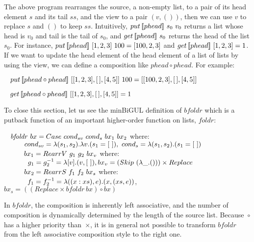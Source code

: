 The above program rearranges the source, a non-empty list, to a pair of its head element $s$ and its tail $ss$, and the view to a pair $(v, ())$, then we can use $v$ to replace $s$ and $()$ to keep $ss$. Intuitively, $put \, [\![phead]\!] \ s_0 \ v_0$ returns a list whose head is $v_0$ and tail is the tail of $s_0$, and $get \, [\![phead]\!] \ s_0$ returns the head of the list $s_0$. For instance, $put \, [\![phead]\!] \ [1,2,3] \ 100 = [100,2,3]$ and $get \, [\![phead]\!] \ [1,2,3] = 1$. If we want to update the head element of the head element of a list of lists by using the view, we can define a composition like $phead \circ phead$. For example:

\smallvspace
$\hspace*{3mm} put \, [\![phead \circ phead]\!] \ [[1,2,3],[\,],[4,5]] \ 100 = [[100,2,3],[\,],[4,5]]$

$\hspace*{3mm} get \, [\![phead \circ phead]\!] \ [[1,2,3],[\,],[4,5]] = 1$
\smallvspace

To close this section,
let us see the minBiGUL definition of $\mathit{bfoldr}$ which is a putback function of an important higher-order function on lists, $\mathit{foldr}$:

\smallvspace
$\tab \mathit{bfoldr} \ bx = Case \ cond_{sv} \ cond_s \ bx_1 \ bx_2$ where:\\
$\tabs{3} \ cond_{sv} = \lambda (s_1,s_2).\lambda v.(s_1 = [\ ]), \ cond_s = \lambda (s_1,s_2).(s_1 = [\ ])$\\
$\tabs{3} \ bx_1 = RearrV \ g_1 \ g_2 \ bx_v$ where: \\
    $\tabs{4} g_1 = g_2^{-1} = \lambda [v].(v,[\ ]), bx_v = (Skip \ (\lambda \_.())) \times Replace$\\
$\tabs{3} \ bx_2 = RearrS \ f_1 \ f_2 \ bx_s$ where:\\
    $\tabs{4} f_1 = f_2^{-1} = \lambda ((x:xs),e).(x,(xs,e))$, 
$bx_s = ((Replace \times bfoldr \ bx) \circ bx)$
\smallvspace

\noindent In $\mathit{bfoldr}$, the composition is inherently left associative, and the number of composition is dynamically determined by the length of the source list. Because~$\circ$ has a higher priority than~$\times$, it is in general not possible to transform $\mathit{bfoldr}$ from the left associative composition style to the right one. 
